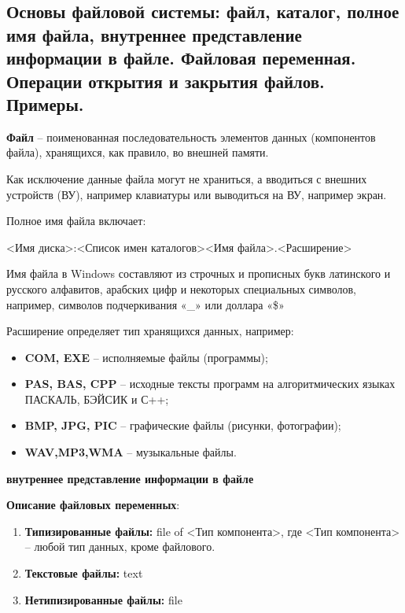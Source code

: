 
\newpage\subsection{Основы файловой системы: файл, каталог, полное имя файла, внутреннее представление 
информации в файле. Файловая переменная. Операции открытия и закрытия файлов. Примеры. }

\begin{myquote}
            
\end{myquote}

{\bf Файл} – поименованная  последовательность элементов данных (компонентов файла), хранящихся, как правило, во внешней памяти. 

Как исключение данные файла могут не храниться, а вводиться с внешних устройств (ВУ), например клавиатуры или выводиться на ВУ, например экран.

Полное имя файла включает:

<Имя диска>:<Список имен каталогов><Имя файла>.<Расширение>

Имя файла в Windows составляют из строчных и прописных букв латинского и русского алфавитов, арабских цифр и некоторых специальных символов, например, символов подчеркивания «\_» или доллара «\$»

Расширение определяет тип хранящихся данных, например:

\begin{itemize}
	\item {\bf COM, EXE} – исполняемые файлы (программы);
	\item {\bf PAS, BAS, CPP} – исходные тексты программ на алгоритмических языках  ПАСКАЛЬ, БЭЙСИК и С++;
	\item {\bf BMP, JPG, PIC} – графические файлы (рисунки, фотографии); 
	\item {\bf WAV,MP3,WMA} – музыкальные файлы.
\end{itemize}

{\bf {внутреннее представление информации в файле}}


{\bf {Описание файловых переменных}}:

\begin{enumerate}
\item {\bf Типизированные файлы:}  	     file of <Тип компонента>,
    где  <Тип компонента> – любой тип данных, кроме файлового.
\item {\bf Текстовые файлы:}     text
\item {\bf Нетипизированные файлы:}   file
\end{enumerate}

